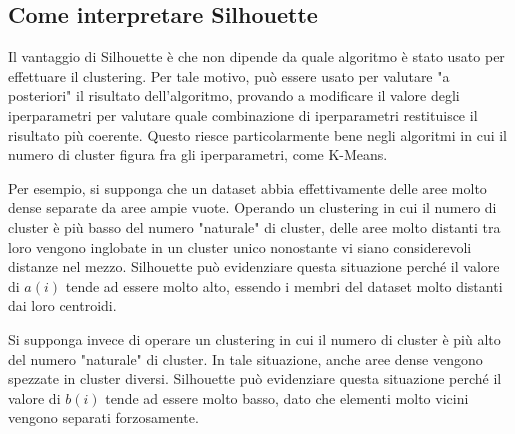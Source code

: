 \documentclass[italian]{article}
\begin{document}
		\subsection{Come interpretare Silhouette}

			Il vantaggio di Silhouette è che non dipende da quale algoritmo
			è stato usato per effettuare il clustering. Per tale motivo, può
			essere usato per valutare "a posteriori" il risultato dell'algoritmo,
			provando a modificare il valore degli iperparametri per valutare
			quale combinazione di iperparametri restituisce il risultato più
			coerente. Questo riesce particolarmente bene negli algoritmi in
			cui il numero di cluster figura fra gli iperparametri, come K-Means.

			Per esempio, si supponga che un dataset abbia effettivamente
			delle aree molto dense separate da aree ampie vuote. Operando
			un clustering in cui il numero di cluster è più basso del numero
			"naturale" di cluster, delle aree molto distanti tra loro vengono
			inglobate in un cluster unico nonostante vi siano considerevoli
			distanze nel mezzo. Silhouette può evidenziare questa situazione
			perché il valore di $a(i)$ tende ad essere molto alto, essendo
			i membri del dataset molto distanti dai loro centroidi.

			Si supponga invece di operare un clustering in cui il numero
			di cluster è più alto del numero "naturale" di cluster. In tale
			situazione, anche aree dense vengono spezzate in cluster diversi.
			Silhouette può evidenziare questa situazione perché il valore di
			$b(i)$ tende ad essere molto basso, dato che elementi molto vicini
			vengono separati forzosamente.
\end{document}
